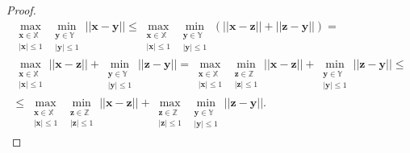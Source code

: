 \documentclass[12pt, twoside]{article}
\numberwithin{equation}{section}
\begin{document}
\begin{proof} 
\begin{equation}
\label{eq:l2:2}
\begin{aligned}
\max_{\substack{\textbf{x} \in \mathbb{X} \\ \left|\textbf{x}\right|\leq 1}}\min_{\substack{\textbf{y} \in \mathbb{Y} \\ \left|\textbf{y}\right|\leq 1}}||\textbf{x}-\textbf{y}||\leq
\max_{\substack{\textbf{x} \in \mathbb{X} \\ \left|\textbf{x}\right|\leq 1}}\min_{\substack{\textbf{y} \in \mathbb{Y} \\ \left|\textbf{y}\right|\leq 1}}\left(||\textbf{x}-\textbf{z}|| + ||\textbf{z} - \textbf{y}||\right) = \\
\max_{\substack{\textbf{x} \in \mathbb{X} \\ \left|\textbf{x}\right|\leq 1}}||\textbf{x}-\textbf{z}|| + \min_{\substack{\textbf{y} \in \mathbb{Y} \\ \left|\textbf{y}\right|\leq 1}}||\textbf{z} - \textbf{y}|| = \max_{\substack{\textbf{x} \in \mathbb{X} \\ \left|\textbf{x}\right|\leq 1}}\min_{\substack{\textbf{z} \in \mathbb{Z} \\ \left|\textbf{z}\right|\leq 1}}||\textbf{x}-\textbf{z}|| + \min_{\substack{\textbf{y} \in \mathbb{Y} \\ \left|\textbf{y}\right|\leq 1}}||\textbf{z} - \textbf{y}|| \leq \\
\leq \max_{\substack{\textbf{x} \in \mathbb{X} \\ \left|\textbf{x}\right|\leq 1}}\min_{\substack{\textbf{z} \in \mathbb{Z} \\ \left|\textbf{z}\right|\leq 1}}||\textbf{x}-\textbf{z}|| + 
\max_{\substack{\textbf{z} \in \mathbb{Z} \\ \left|\textbf{z}\right|\leq 1}}\min_{\substack{\textbf{y} \in \mathbb{Y} \\ \left|\textbf{y}\right|\leq 1}}||\textbf{z}-\textbf{y}||.
\end{aligned}
\end{equation}
\end{proof}
\end{document}
